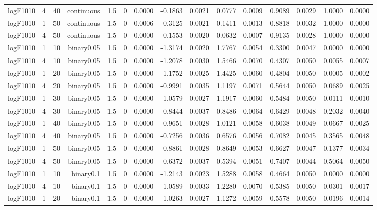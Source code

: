 \begin{longtable}{rrrrrrrrrrrrrrr}
  logF1010 & 4 & 40 & continuous & 1.5 & 0 & 0.0000 & -0.1863 & 0.0021 & 0.0777 & 0.0009 & 0.9089 & 0.0029 & 1.0000 & 0.0000 \\ 
  logF1010 & 1 & 50 & continuous & 1.5 & 0 & 0.0006 & -0.3125 & 0.0021 & 0.1411 & 0.0013 & 0.8818 & 0.0032 & 1.0000 & 0.0000 \\ 
  logF1010 & 4 & 50 & continuous & 1.5 & 0 & 0.0000 & -0.1553 & 0.0020 & 0.0632 & 0.0007 & 0.9135 & 0.0028 & 1.0000 & 0.0000 \\ 
  logF1010 & 1 & 10 & binary0.05 & 1.5 & 0 & 0.0000 & -1.3174 & 0.0020 & 1.7767 & 0.0054 & 0.3300 & 0.0047 & 0.0000 & 0.0000 \\ 
  logF1010 & 4 & 10 & binary0.05 & 1.5 & 0 & 0.0000 & -1.2078 & 0.0030 & 1.5466 & 0.0070 & 0.4307 & 0.0050 & 0.0055 & 0.0007 \\ 
  logF1010 & 1 & 20 & binary0.05 & 1.5 & 0 & 0.0000 & -1.1752 & 0.0025 & 1.4425 & 0.0060 & 0.4804 & 0.0050 & 0.0005 & 0.0002 \\ 
  logF1010 & 4 & 20 & binary0.05 & 1.5 & 0 & 0.0000 & -0.9991 & 0.0035 & 1.1197 & 0.0071 & 0.5644 & 0.0050 & 0.0689 & 0.0025 \\ 
  logF1010 & 1 & 30 & binary0.05 & 1.5 & 0 & 0.0000 & -1.0579 & 0.0027 & 1.1917 & 0.0060 & 0.5484 & 0.0050 & 0.0111 & 0.0010 \\ 
  logF1010 & 4 & 30 & binary0.05 & 1.5 & 0 & 0.0000 & -0.8444 & 0.0037 & 0.8486 & 0.0064 & 0.6429 & 0.0048 & 0.2032 & 0.0040 \\ 
  logF1010 & 1 & 40 & binary0.05 & 1.5 & 0 & 0.0000 & -0.9651 & 0.0028 & 1.0121 & 0.0058 & 0.6038 & 0.0049 & 0.0667 & 0.0025 \\ 
  logF1010 & 4 & 40 & binary0.05 & 1.5 & 0 & 0.0000 & -0.7256 & 0.0036 & 0.6576 & 0.0056 & 0.7082 & 0.0045 & 0.3565 & 0.0048 \\ 
  logF1010 & 1 & 50 & binary0.05 & 1.5 & 0 & 0.0000 & -0.8861 & 0.0028 & 0.8649 & 0.0053 & 0.6627 & 0.0047 & 0.1377 & 0.0034 \\ 
  logF1010 & 4 & 50 & binary0.05 & 1.5 & 0 & 0.0000 & -0.6372 & 0.0037 & 0.5394 & 0.0051 & 0.7407 & 0.0044 & 0.5064 & 0.0050 \\ 
  logF1010 & 1 & 10 & binary0.1 & 1.5 & 0 & 0.0000 & -1.2143 & 0.0023 & 1.5288 & 0.0058 & 0.4664 & 0.0050 & 0.0000 & 0.0000 \\ 
  logF1010 & 4 & 10 & binary0.1 & 1.5 & 0 & 0.0000 & -1.0589 & 0.0033 & 1.2280 & 0.0070 & 0.5385 & 0.0050 & 0.0301 & 0.0017 \\ 
  logF1010 & 1 & 20 & binary0.1 & 1.5 & 0 & 0.0000 & -1.0263 & 0.0027 & 1.1272 & 0.0059 & 0.5578 & 0.0050 & 0.0196 & 0.0014 \\ 

\end{longtable}
